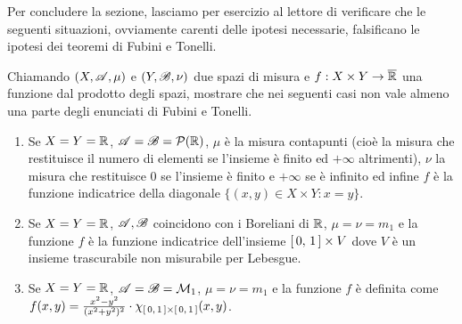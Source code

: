 Per concludere la sezione, lasciamo per esercizio al lettore di verificare che le seguenti situazioni, ovviamente carenti delle ipotesi necessarie, falsificano le ipotesi dei teoremi di Fubini e Tonelli.

\begin{exercise}\label{ex:ControesempiFubini}
	Chiamando $(X,\mathscr A,\mu)$ e $(Y,\mathscr B,\nu)$ due spazi di misura e $f:X\times Y\to \overline{\mathbb R}$ una funzione dal prodotto degli spazi, mostrare che nei seguenti casi non vale almeno una parte degli enunciati di Fubini e Tonelli.
	\begin{enumerate}
		\item Se $X=Y=\mathbb R$, $\mathscr A=\mathscr B=\mathcal P(\mathbb R)$, $\mu$ è la misura contapunti (cioè la misura che restituisce il numero di elementi se l'insieme è finito ed $+\infty$ altrimenti), $\nu$ la misura che restituisce $0$ se l'insieme è finito e $+\infty$ se è infinito ed infine $f$ è la funzione indicatrice della diagonale $\{(x,y)\in X\times Y: x=y\}$.
		\item Se $X=Y=\mathbb R$, $\mathscr A,\mathscr B$ coincidono con i Boreliani di $\mathbb R$, $\mu=\nu=m_1$ e la funzione $f$ è la funzione indicatrice dell'insieme $\left[\,0,\,1\,\right]\times V$ dove $V$ è un insieme trascurabile non misurabile per Lebesgue.
		\item Se $X=Y=\mathbb R$, $\mathscr A=\mathscr B=\mathcal M_1$, $\mu=\nu=m_1$ e la funzione $f$ è definita come $f(x,y)=\frac{x^2-y^2}{(x^2+y^2)^2}\cdot\chi_{\left[\,0,\,1\,\right]\times\left[\,0,\,1\,\right]}(x,y)$.
	\end{enumerate}
\end{exercise}
